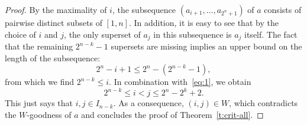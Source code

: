 \documentclass{article}
\begin{document}
\begin{proof}
  By the maximality of $i$, the subsequence $(a_{i+1}, \dots, a_{2^n+1})$ of $a$ consists of pairwise distinct subsets of $[1,n]$. In addition, it is easy to see that by the choice of $i$ and $j$, the only superset of $a_j$ in this subsequence is $a_j$ itself. The fact that the remaining $2^{n-k}-1$ supersets are missing implies an upper bound on the length of the subsequence:
  \begin{equation*}
    2^n - i + 1 \leq 2^n - (2^{n-k}-1),
  \end{equation*}
  from which we find $2^{n-k} \leq i$. In combination with~\eqref{eq:1}, we obtain
  \begin{equation}
    \label{eq:6}
    2^{n-k} \leq i < j \leq 2^n - 2^k + 2.
  \end{equation}
  This just says that $i,j\in I_{n-k}$. As a consequence, $(i,j)\in
  W$, which contradicts the $W$-goodness of $a$ and concludes the proof of Theorem~\ref{t:crit-all}.
\end{proof}
\end{document}
